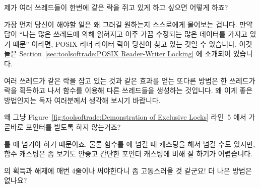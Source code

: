 \begin{enumerate}
\QuickQ{}
	제가 여러 쓰레드들이 한번에 같은 락을 쥐고 있게 하고 싶으면 어떻게
	하죠?

\QuickA{}
	가장 먼저 당신이 해야할 일은 왜 그러길 원하는지 스스로에게 물어보는
	겁니다.
	만약 답이 ``나는 많은 쓰레드에 의해 읽혀지고 아주 가끔 수정되는 많은
	데이터를 가지고 있기 때문'' 이라면, POSIX 리더-라이터 락이 당신이 찾고
	있는 것일 수 있습니다.
	이것들은 Section~\ref{sec:toolsoftrade:POSIX Reader-Writer Locking} 에
	소개되어 있습니다.

	여러 쓰레드가 같은 락을 잡고 있는 것과 같은 효과를 얻는 또다른 방법은
	한 쓰레드가 락을 획득하고 나서  함수를 이용해 다른
	쓰레드들을 생성하는 것입니다.
	왜 이게 좋은 방법인지는 독자 여러분께서 생각해 보시기 바랍니다.

\QuickQ{}
	왜 그냥 Figure~\ref{fig:toolsoftrade:Demonstration of Exclusive Locks}
	라인~5 에서  가 곧바로  포인터를
	받도록 하지 않는거죠?

\QuickA{}
	 를  에 넘겨야 하기 때문이죠.
	물론 함수를  에 넘길 때 캐스팅을 해서 넘길 수도
	있지만, 함수 캐스팅은 좀 보기도 안좋고 간단한 포인터 캐스팅에 비해
	잘 하기가 어렵습니다.

\QuickQ{}
	 의 획득과 해제에 매번 4줄이나 써야한다니 좀
	고통스러울 것 같군요!
	더 나은 방법은 없나요?


\end{enumerate}

